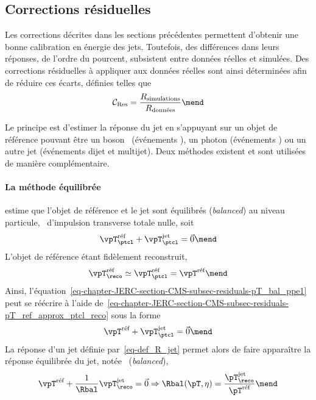 \subsection{Corrections résiduelles}\label{chapter-JERC-section-CMS-subsec-residuals}
Les corrections décrites dans les sections précédentes permettent d'obtenir une bonne calibration en énergie des jets.
Toutefois, des différences dans leurs réponses, de l'ordre du pourcent, subsistent entre données réelles et simulées.
Des corrections résiduelles à appliquer aux données réelles sont ainsi déterminées afin de réduire ces écarts, définies telles que
\begin{equation}
\mathcal{C}_\text{Res} = \frac{R_\text{simulations}}{R_\text{données}}
\mend
\label{eq-chapter-JERC-section-CMS-subsec-residuals-Cres_def}
\end{equation}
\par Le principe est d'estimer la réponse du jet en s'appuyant sur un objet de référence pouvant être un boson \Zboson\ (événements \Zjets), un photon (événements \Gjets) ou un autre jet (événements dijet et multijet).
Deux méthodes existent et sont utilisées de manière complémentaire.
\paragraph{La méthode équilibrée} estime que l'objet de référence et le jet sont équilibrés (\emph{balanced}) au niveau particule, \ie\ d'impulsion transverse totale nulle, soit
\begin{equation}
\vpT_\ptcl^\text{réf} + \vpT_\ptcl^\text{jet} = \vec{0}
\mend
\label{eq-chapter-JERC-section-CMS-subsec-residuals-pT_bal_ppe1}
\end{equation}
L'objet de référence étant fidèlement reconstruit,
\begin{equation}
\vpT_\reco^\text{réf} \simeq \vpT_\ptcl^\text{réf} = \vpT^\text{réf}
\mend
\label{eq-chapter-JERC-section-CMS-subsec-residuals-pT_ref_approx_ptcl_reco}
\end{equation}
Ainsi, l'équation~\eqref{eq-chapter-JERC-section-CMS-subsec-residuals-pT_bal_ppe1} peut se réécrire à l'aide de~\eqref{eq-chapter-JERC-section-CMS-subsec-residuals-pT_ref_approx_ptcl_reco} sous la forme
\begin{equation}
\vpT^\text{réf} + \vpT_\ptcl^\text{jet} = \vec{0}
\mend
\label{eq-chapter-JERC-section-CMS-subsec-residuals-pT_bal_ppe2}
\end{equation}
La réponse d'un jet définie par~\eqref{eq-def_R_jet} permet alors de faire apparaître la réponse équilibrée du jet, notée \Rbal\ (\emph{balanced}),
\begin{equation}
\vpT^\text{réf} + \frac{1}{\Rbal} \vpT_\reco^\text{jet} = \vec{0}
\Rightarrow
\Rbal (\pT, \eta) = \frac{\pT_\reco^\text{jet}}{\pT^\text{réf}}
\label{eq-chapter-JERC-section-CMS-subsec-residuals-Rbal_def}
\mend
\end{equation}
